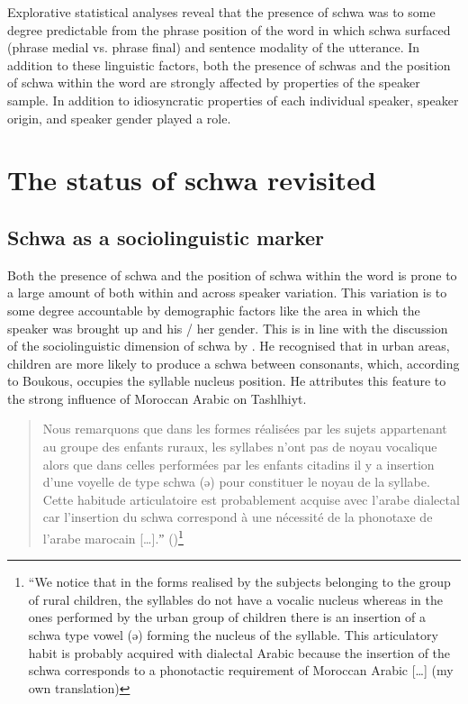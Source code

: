 \newpage
Explorative statistical analyses reveal that the presence of schwa was to some degree predictable from the phrase position of the word in which schwa surfaced (phrase medial vs. phrase final) and sentence modality of the utterance. In addition to these linguistic factors, both the presence of schwas and the position of schwa within the word are strongly affected by properties of the speaker sample. In addition to idiosyncratic properties of each individual speaker, speaker origin, and speaker gender played a role. 

\section{The status of schwa revisited}\label{sec:6.5}
\subsection{Schwa as a sociolinguistic marker}
Both the presence of schwa and the position of schwa within the word is prone to a large amount of both within and across speaker variation. This variation is to some degree accountable by demographic factors like the area in which the speaker was brought up and his / her gender. This is in line with the discussion of the sociolinguistic dimension of schwa by \citet{Boukous2012}. He recognised that in urban areas, children are more likely to produce a schwa between consonants, which, according to Boukous, occupies the syllable nucleus position. He attributes this feature to the strong influence of Moroccan Arabic on Tashlhiyt.  

\begin{quote}
 
Nous remarquons que dans les formes réalisées par les sujets appartenant au groupe des enfants ruraux, les syllabes n'ont pas de noyau vocalique alors que dans celles performées par les enfants citadins il y a insertion d'une voyelle de type schwa (ə) pour constituer le noyau de la syllabe. Cette habitude articulatoire est probablement acquise avec l'arabe dialectal car l'insertion du schwa correspond à une nécessité de la phonotaxe de l'arabe marocain […].ˮ (\citealt[83]{Boukous2012})\footnote{“We notice that in the forms realised by the subjects belonging to the group of rural children, the syllables do not have a vocalic nucleus whereas in the ones performed by the urban group of children there is an insertion of a schwa type vowel (ə) forming the nucleus of the syllable. This articulatory habit is probably acquired with dialectal Arabic because the insertion of the schwa corresponds to a phonotactic requirement of Moroccan Arabic […] (my own translation)}
\end{quote}

